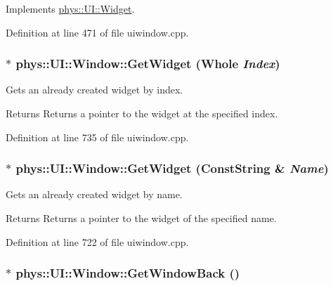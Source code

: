 Implements \hyperlink{classphys_1_1UI_1_1Widget_a07039c19e57de314147ce066417da0a2}{phys::UI::Widget}.



Definition at line 471 of file uiwindow.cpp.

\hypertarget{classphys_1_1UI_1_1Window_a267f830c09afa7f5455be14c2fc52ecd}{
\subsubsection[{GetWidget}]{ $\ast$ phys::UI::Window::GetWidget ({\bf Whole} {\em Index})}}
\label{d4/d86/classphys_1_1UI_1_1Window_a267f830c09afa7f5455be14c2fc52ecd}


Gets an already created widget by index. 

\begin{DoxyReturn}{Returns}
Returns a pointer to the widget at the specified index. 
\end{DoxyReturn}


Definition at line 735 of file uiwindow.cpp.

\hypertarget{classphys_1_1UI_1_1Window_a0d2274afdabda9915d242dc3d057ae61}{
\subsubsection[{GetWidget}]{ $\ast$ phys::UI::Window::GetWidget ({\bf ConstString} \& {\em Name})}}
\label{d4/d86/classphys_1_1UI_1_1Window_a0d2274afdabda9915d242dc3d057ae61}


Gets an already created widget by name. 

\begin{DoxyReturn}{Returns}
Returns a pointer to the widget of the specified name. 
\end{DoxyReturn}


Definition at line 722 of file uiwindow.cpp.

\hypertarget{classphys_1_1UI_1_1Window_af06ae5666145e4d8835b38f4a9cbca2a}{
\subsubsection[{GetWindowBack}]{ $\ast$ phys::UI::Window::GetWindowBack ()}}
\label{d4/d86/classphys_1_1UI_1_1Window_af06ae5666145e4d8835b38f4a9cbca2a}


